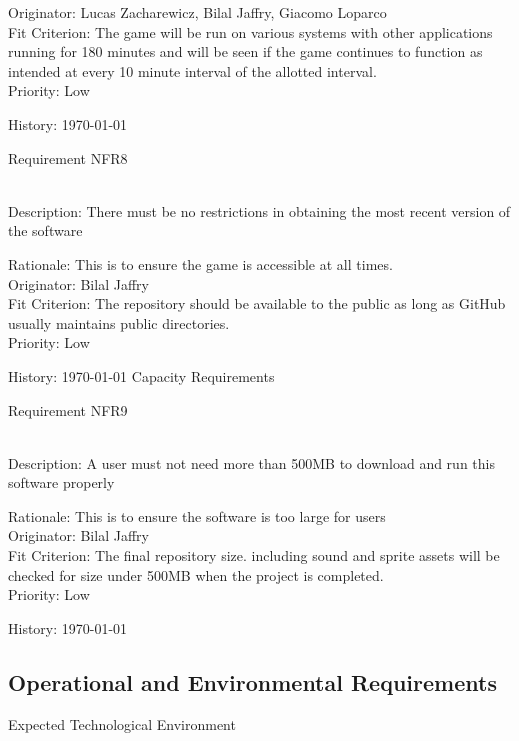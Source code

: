 \documentclass[12pt, titlepage]{article}
\begin{document}
\begin{enumerate}
{\color{blue}Originator: Lucas Zacharewicz, Bilal Jaffry, Giacomo Loparco}\\

{\color{blue}Fit Criterion: The game will be run on various systems with other applications running for 180 minutes and will be seen if the game continues to function as intended at every 10 minute interval of the allotted interval. }\\
 
{\color{blue}Priority: Low}
  
{\color{blue}History: \today}

{\color{blue}\item Requirement NFR8}\\
{\color{blue} Description:} There must be no restrictions in obtaining the most recent version of the software

{\color{blue}Rationale: This is to ensure the game is accessible at all times.}\\

{\color{blue}Originator: Bilal Jaffry}\\

{\color{blue}Fit Criterion: The repository should be available to the public as long as GitHub usually maintains public directories. }\\
 
{\color{blue}Priority: Low}
  
{\color{blue}History: \today}
\newpage
Capacity Requirements

{\color{blue}\item Requirement NFR9}\\
{\color{blue} Description:} A user must not need more than 500MB to download and run this software properly

{\color{blue}Rationale: This is to ensure the software is too large for users}\\

{\color{blue}Originator: Bilal Jaffry}\\

{\color{blue}Fit Criterion: The final repository size. including sound and sprite assets will be checked for size under 500MB when the project is completed. }\\
 
{\color{blue}Priority: Low}
  
{\color{blue}History: \today}

\subsection{Operational and Environmental Requirements}
Expected Technological Environment 


\end{enumerate}
\end{document}
